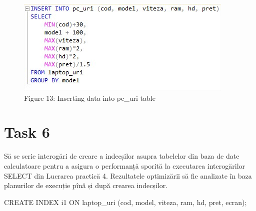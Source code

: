 \begin{figure}[H]
	\centering
		\includegraphics[width=\linewidth]{screens/16.jpg}
		\caption*{Figure 13: Inserting data into pc\_uri table}
		\label{}
	\endminipage\hfill
\end{figure}

\section{Task 6}
Să se scrie interogări de creare a indecșilor asupra tabelelor din baza de date calculatoare pentru a asigura o performanță sporită la executarea interogărilor SELECT din Lucrarea practică 4. Rezultatele optimizării să fie analizate în baza planurilor de execuție pînă și după crearea indecșilor.

CREATE INDEX i1 ON laptop\_uri (cod, model, viteza, ram, hd, pret, ecran);
	
